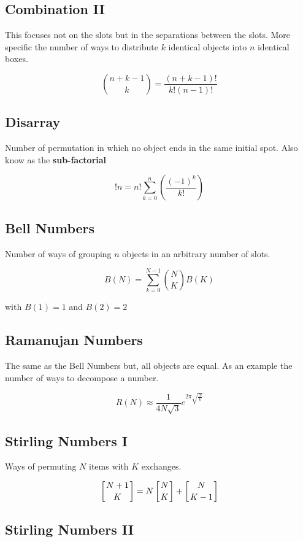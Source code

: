 \subsection{Combination II}

This focuses not on the slots but in the separations between the slots.
More specific the number of ways to distribute \(k\) identical objects into \(n\) identical boxes. 

\[\binom{n + k - 1}{k} = \frac{(n + k - 1)!}{k!(n - 1)!}\]

\subsection{Disarray}

Number of permutation in which no object ends in the same initial spot. Also know as the \textbf{sub-factorial}

\[!n = n! \sum_{k = 0}^{n} \left(\frac{{(-1)}^k}{k!}\right)\]

\subsection{Bell Numbers}

Number of ways of grouping \(n\) objects in an arbitrary number of slots.

\[B(N) = \sum_{k = 0}^{N-1}\binom{N}{K}B(K)\]

with \(B(1) = 1\) and \(B(2) = 2\)

\subsection{Ramanujan Numbers}

The same as the Bell Numbers but, all objects are equal. As an example the number of ways
to decompose a number.

\[R(N) \approx \frac{1}{4N\sqrt{3}} e^{2\pi \sqrt{\frac{N}{6}}}\]

\subsection{Stirling Numbers I}

Ways of permuting \(N\) items with \(K\) exchanges.

\[ \left[ N + 1 \atop K\right] = N\left[N \atop K\right] + \left[N \atop K - 1\right]\] 

\subsection{Stirling Numbers II}

